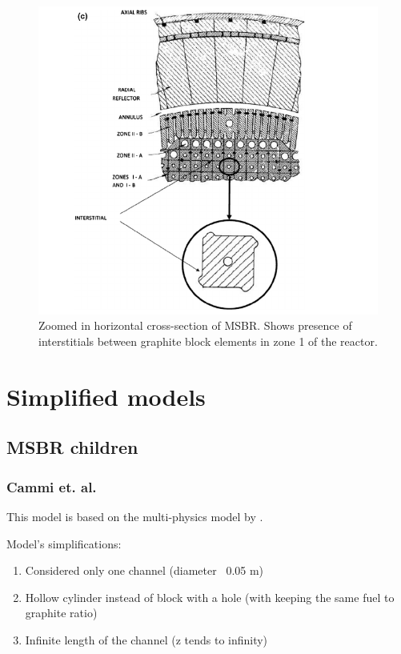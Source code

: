 \documentclass{article}
\begin{document}
\begin{figure}[htpb]
  \centering
  \includegraphics{zoomed_horizontal_MSBR_cross_section.png}
  \caption{Zoomed in horizontal cross-section of MSBR. Shows presence of
    interstitials between graphite block elements in zone 1 of the reactor.}
  \label{fig:zoom_horiz}
\end{figure}

\section{Simplified models}

\subsection{MSBR children}

\subsubsection{Cammi et. al.}

This model is based on the multi-physics model by
\cite{cammi_multi-physics_2011}.

Model's simplifications:
\begin{enumerate}
	\item Considered only one channel (diameter ~0.05 m)
	\item Hollow cylinder instead of block with a hole (with keeping the same fuel to graphite ratio) 
	\item Infinite length of the channel (z tends to infinity)
\end{enumerate}
\end{document}
